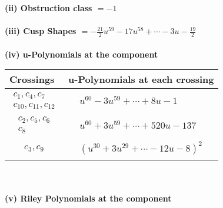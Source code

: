 \documentclass[1p]{elsarticle_modified}
\theoremstyle{definition}
\begin{document}
\flushleft \textbf{(ii) Obstruction class $= -1$}\\~\\
\flushleft \textbf{(iii) Cusp Shapes $= -\frac{21}{2} u^{59}-17 u^{58}+\cdots-3 u-\frac{19}{2}$}\\~\\
\newpage\renewcommand{\arraystretch}{1}
\flushleft \textbf{(iv) u-Polynomials at the component}\newline \\
\begin{tabular}{m{50pt}|m{274pt}}
Crossings & \hspace{64pt}u-Polynomials at each crossing \\
\hline $$\begin{aligned}c_{1},c_{4},c_{7}\\c_{10},c_{11},c_{12}\end{aligned}$$&$\begin{aligned}
&u^{60}-3 u^{59}+\cdots+8 u-1
\end{aligned}$\\
\hline $$\begin{aligned}c_{2},c_{5},c_{6}\\c_{8}\end{aligned}$$&$\begin{aligned}
&u^{60}+3 u^{59}+\cdots+520 u-137
\end{aligned}$\\
\hline $$\begin{aligned}c_{3},c_{9}\end{aligned}$$&$\begin{aligned}
&(u^{30}+3 u^{29}+\cdots-12 u-8)^{2}
\end{aligned}$\\
\hline
\end{tabular}\\~\\
\newpage\renewcommand{\arraystretch}{1}
\flushleft \textbf{(v) Riley Polynomials at the component}\newline \\
\end{document}
